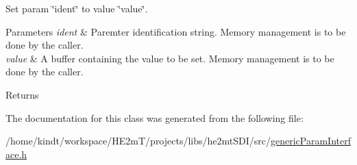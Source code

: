 Set param \char`\"{}ident\char`\"{} to value \char`\"{}value\char`\"{}. 


\begin{DoxyParams}{Parameters}
{\em ident} & Paremter identification string. Memory management is to be done by the caller. \\
\hline
{\em value} & A buffer containing the value to be set. Memory management is to be done by the caller. \\
\hline
\end{DoxyParams}
\begin{DoxyReturn}{Returns}

\end{DoxyReturn}


The documentation for this class was generated from the following file\-:\begin{DoxyCompactItemize}
\item 
/home/kindt/workspace/\-H\-E2m\-T/projects/libs/he2mt\-S\-D\-I/src/\hyperlink{generic_param_interface_8h}{generic\-Param\-Interface.\-h}\end{DoxyCompactItemize}
